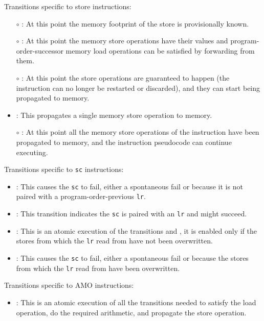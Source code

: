 \noindent Transitions specific to store instructions:
\begin{itemize}
\item[$\circ$] : At this point the memory footprint of the store is provisionally known.
\item[$\circ$] : At this point the memory store operations have their values and program-order-successor memory load operations can be satisfied by forwarding from them.
\item[$\circ$] : At this point the store operations are guaranteed to happen (the instruction can no longer be restarted or discarded), and they can start being propagated to memory.
\item {}: This propagates a single memory store operation to memory.
\item[$\circ$] : At this point all the memory store operations of the instruction have been propagated to memory, and the instruction pseudocode can continue executing.
\end{itemize}

\noindent Transitions specific to {\tt  sc} instructions:
\begin{itemize}
\item {}: This causes the {\tt sc} to fail, either a spontaneous fail or because it is not paired with a program-order-previous {\tt lr}.
\item {}: This transition indicates the {\tt sc} is paired with an {\tt lr} and might succeed.
\item {}: This is an atomic execution of the transitions  and , it is enabled only if the stores from which the {\tt lr} read from have not been overwritten.
\item {}: This causes the {\tt sc} to fail, either a spontaneous fail or because the stores from which the {\tt lr} read from have been overwritten.
\end{itemize}

\noindent Transitions specific to AMO instructions:
\begin{itemize}
\item {}: This is an atomic execution of all the transitions needed to satisfy the load operation, do the required arithmetic, and propagate the store operation.
\end{itemize}

